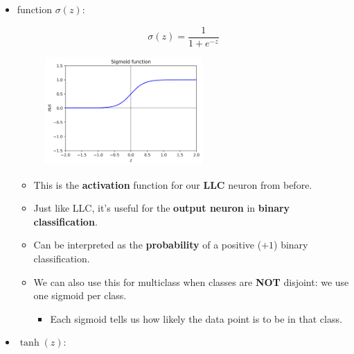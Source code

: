 \begin{itemize}
            
            \item {} function $\sigma(z)$:
            
                \begin{equation}
                    \sigma(z) = \frac{1}{1+e^{-z}}
                \end{equation}
                
                \begin{figure}[H]
                    \centering
                    \includegraphics[width=60mm,scale=0.4]{images/nn_images/sigmoid_fn.png}
                \end{figure}
            
                \begin{itemize}
                    \item This is the \textbf{activation} function for our \textbf{LLC} neuron from before.
                    
                    \item Just like LLC, it's useful for the \textbf{output neuron} in \textbf{binary classification}.
                    
                    \item Can be interpreted as the \textbf{probability} of a positive ($+1$) binary classification.

                    \item We can also use this for multiclass when classes are \textbf{NOT} disjoint: we use one sigmoid per class.
                        \begin{itemize}
                            \item Each sigmoid tells us how likely the data point is to be in that class.
                        \end{itemize}
                \end{itemize}
                
            \item {} $\tanh(z)$:    
                

\end{itemize}
